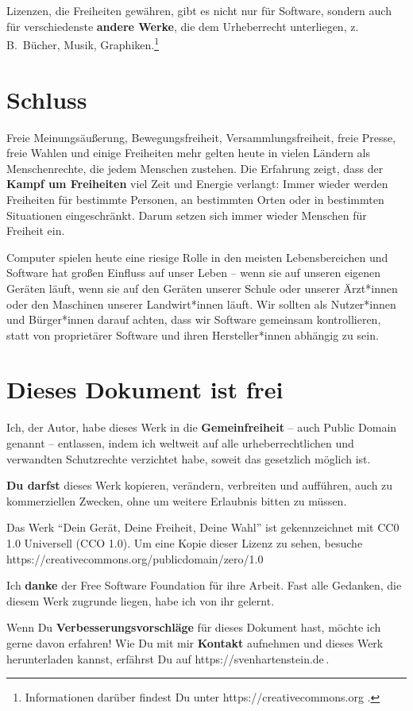 \documentclass[a5paper,12pt]{scrartcl}
\begin{document}
Lizenzen, die Freiheiten gewähren, gibt es nicht nur für Software,
sondern auch für verschiedenste \textbf{andere Werke}, die dem
Urheberrecht unterliegen, z.\,B.\ Bücher, Musik,
Graphiken.\footnote{Informationen darüber findest Du unter
  https://creativecommons.org .}


\section{Schluss}

Freie Meinungsäußerung, Bewegungsfreiheit, Versammlungsfreiheit, freie
Presse, freie Wahlen und einige Freiheiten mehr gelten heute in vielen
Ländern als Menschenrechte, die jedem Menschen zustehen. Die Erfahrung
zeigt, dass der \textbf{Kampf um Freiheiten} viel Zeit und Energie
verlangt: Immer wieder werden Freiheiten für bestimmte Personen, an
bestimmten Orten oder in bestimmten Situationen eingeschränkt. Darum
setzen sich immer wieder Menschen für Freiheit ein.

Computer spielen heute eine riesige Rolle in den meisten
Lebensbereichen und Software hat großen Einfluss auf unser Leben --
wenn sie auf unseren eigenen Geräten läuft, wenn sie auf den Geräten
unserer Schule oder unserer Ärzt*innen oder den Maschinen unserer
Landwirt*innen läuft. Wir sollten als Nutzer*innen und Bürger*innen
darauf achten, dass wir Software gemeinsam kontrollieren, statt von
proprietärer Software und ihren Hersteller*innen abhängig zu sein.


\section{Dieses Dokument ist frei}

Ich, der Autor, habe dieses Werk in die \textbf{Gemeinfreiheit} --
auch Public Domain genannt -- entlassen, indem ich weltweit auf alle
urheberrechtlichen und verwandten Schutzrechte verzichtet habe, soweit
das gesetzlich möglich ist.

\textbf{Du darfst} dieses Werk kopieren, verändern, verbreiten und
aufführen, auch zu kommerziellen Zwecken, ohne um weitere Erlaubnis
bitten zu müssen.

Das Werk "`Dein Gerät, Deine Freiheit, Deine Wahl"' %
ist gekennzeichnet mit CC0 1.0 Universell (CCO
1.0). Um eine Kopie dieser Lizenz zu sehen,
besuche\\
https://creativecommons.org/publicdomain/zero/1.0

Ich \textbf{danke} der Free Software Foundation für ihre Arbeit. Fast
alle Gedanken, die diesem Werk zugrunde liegen, habe ich von ihr
gelernt.

Wenn Du \textbf{Verbesserungsvorschläge} für dieses Dokument hast,
möchte ich gerne davon erfahren! Wie Du mit mir \textbf{Kontakt}
aufnehmen und dieses Werk herunterladen kannst, erfährst Du auf
https://svenhartenstein.de\,.
\end{document}
